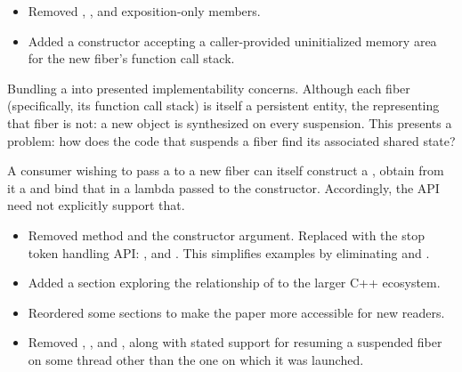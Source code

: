 
\begin{itemize}
    \item Removed \getsource, \gettoken, \reqstop and
          exposition-only  members.
    \item Added a \fiber constructor accepting a caller-provided
          uninitialized memory area for the new fiber's function call stack.
\end{itemize}

Bundling a  into \fiber presented implementability concerns.
Although each fiber (specifically, its function call stack) is itself a
persistent entity, the \fiber representing that fiber is not: a
new \fiber object is synthesized on every suspension. This
presents a problem: how does the code that suspends a fiber find its
associated  shared state?

A consumer wishing to pass a  to a new fiber can itself
construct a , obtain from it a  and
bind that  in a lambda passed to the \fiber
constructor. Accordingly, the \fiber API need not explicitly support that.


\begin{itemize}
    \item Removed  method and the \cancelfn constructor
          argument. Replaced with the  stop token handling
          API: \getsource, \gettoken and \reqstop. This simplifies examples by
          eliminating  and .
    \item Added a section exploring the relationship of \fiber to the larger
          C++ ecosystem.
    \item Reordered some sections to make the paper more accessible for new readers.
\end{itemize}


\begin{itemize}
    \item Removed \xtresume, \xtresumewith, \xtcancel and \canxtresume, along
          with stated support for resuming a suspended fiber on some thread
          other than the one on which it was launched.
\end{itemize}

